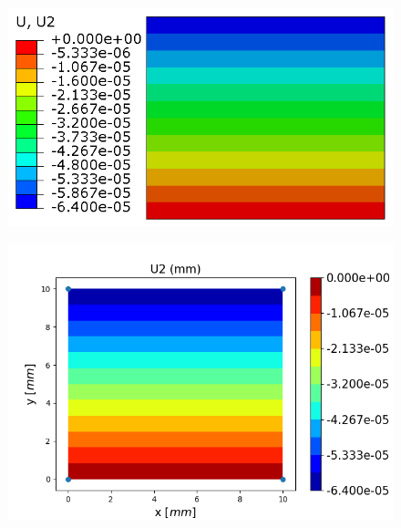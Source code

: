 \documentclass[11pt]{article}
\begin{document}
\begin{figure}[H]
	\centering
	\begin{minipage}{.5\textwidth}
		\centering
		\includegraphics[width=1\linewidth]{M1U2.png}
		\label{M1U2}
	\end{minipage}%
	\begin{minipage}{.55\textwidth}
		\centering
		\includegraphics[width=1\linewidth]{M1U2_IGA.png}
		\label{M1U2_IGA}
	\end{minipage}
\end{figure}
\end{document}

